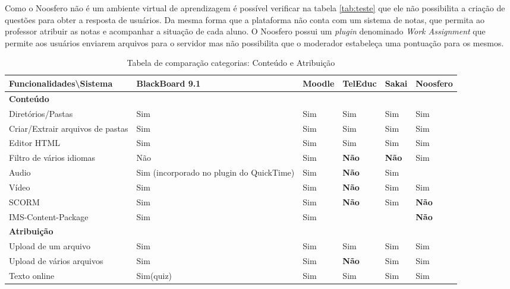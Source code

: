 Como o Noosfero não é um ambiente virtual de aprendizagem é possível verificar na tabela \ref{tab:teste} que ele não possibilita a criação de questões para obter a resposta de usuários. Da mesma forma que a plataforma não conta com um sistema de notas, que permita ao professor atribuir as notas e acompanhar a situação de cada aluno. O Noosfero possui um \textit{plugin} denominado \textit{Work Assignment} que permite aos usuários enviarem arquivos para o servidor mas não possibilita que o moderador estabeleça uma pontuação para os mesmos.

\begin{landscape}
\begin{table}[H]
\begin{center}
\begin{tabular}{|@{}p{5.5cm}|p{3.5cm}|p{3.5cm}|p{3.5cm}|p{3.5cm}|p{3.5cm}@{}|}
\hline
\textbf{Funcionalidades\textbackslash Sistema} & \textbf{BlackBoard 9.1} & \textbf{Moodle} & \textbf{TelEduc} & \textbf{Sakai} & \textbf{Noosfero}\\ \hline
\textbf{Conteúdo} &  &  &  &  &  \\
Diretórios/Pastas & Sim & Sim & Sim & Sim & Sim \\
Criar/Extrair arquivos de pastas & Sim & Sim & Sim & Sim & Sim \\
Editor HTML & Sim & Sim & Sim & Sim & Sim \\
Filtro de vários idiomas & Não & Sim & \textbf{Não} & \textbf{Não} & Sim \\
Audio & Sim {\tiny (incorporado no plugin do QuickTime)} & Sim & \textbf{Não} & Sim &  \\
Vídeo & Sim & Sim & \textbf{Não} & Sim & Sim \\
SCORM & Sim & Sim & \textbf{Não} & Sim & \textbf{Não} \\
IMS-Content-Package & Sim & Sim &  &  & \textbf{Não} \\
\textbf{Atribuição} &  &  &  &  &  \\
Upload de um arquivo & Sim & Sim & Sim & Sim & Sim \\
Upload de vários arquivos & Sim & Sim & \textbf{Não} & Sim & Sim \\
Texto online & Sim(quiz) & Sim & Sim & Sim & Sim \\ \hline
\end{tabular}
\caption{Tabela de comparação categorias: Conteúdo e Atribuição}
\label{tab:conteudo-atribuicao}
\end{center}
\end{table}


\end{landscape}
